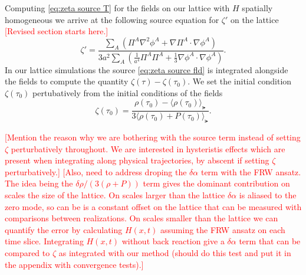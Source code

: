 Computing \eqref{eq:zeta source T} for the fields on our lattice with $H$ spatially homogeneous we arrive at the following source equation for $\zeta'$ on the lattice
%
\textcolor{red}{[Revised section starts here.]}
\begin{equation} \label{eq:zeta source fld}
  \zeta' = \frac{\sum_A\left(\Pi^A\nabla^2\phi^A + \nabla\Pi^A\cdot\nabla\phi^A\right)}{3a^2\sum_A\left(\frac{1}{a^4}\Pi^A\Pi^A + \frac{1}{3}\nabla\phi^A\cdot\nabla\phi^A \right)}.
\end{equation}
In our lattice simulations the source \eqref{eq:zeta source fld} is integrated alongside the fields to compute the quantity $\zeta(\tau) - \zeta(\tau_0)$.
We set the initial condition $\zeta(\tau_0)$ pertubatively from the initial conditions of the fields
\begin{equation}
  \zeta(\tau_0) = \frac{\rho(\tau_0)-\langle\rho(\tau_0)\rangle_\lat}{3\langle\rho(\tau_0)+P(\tau_0)\rangle_\lat}.
\end{equation}

\textcolor{red}{[Mention the reason why we are bothering with the source term instead of setting $\zeta$ perturbatively throughout. We are interested in hysteristis effects which are present when integrating along physical trajectories, by abscent if setting $\zeta$ perturbatively.]}
\textcolor{red}{[Also, need to address droping the $\delta\alpha$ term with the FRW ansatz. The idea being the $\delta\rho/(3(\rho+P))$ term gives the dominant contribution on scales the size of the lattice. On scales larger than the lattice $\delta\alpha$ is aliased to the zero mode, so can be is a constant offset on the lattice that can be measured with comparisons between realizations. On scales smaller than the lattice we can quantify the error by calculating $H(x,t)$ assuming the FRW ansatz on each time slice. Integrating $H(x,t)$ without back reaction give a $\delta\alpha$ term that can be compared to $\zeta$ as integrated with our method (should do this test and put it in the appendix with convergence tests).]}

